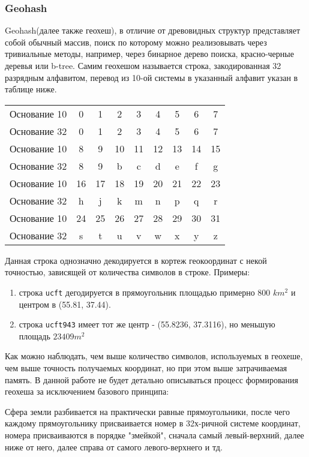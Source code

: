 \subsubsection{Geohash}
Geohash(далее также геохеш), в отличие от древовидных структур представляет собой обычный массив, поиск по которому можно реализовывать через тривиальные методы, например, через бинарное дерево поиска, красно-черные деревья или b-tree.
Самим геохешом называется строка, закодированная 32 разрядным алфавитом, перевод из 10-ой системы в указанный алфавит указан в таблице ниже.
\begin{center}
\begin{tabular}{ c|c c c c c c c c }
 Основание 10 & 0 & 1 & 2 & 3 & 4 & 5 & 6 & 7 \\
 Основание 32 & 0 & 1 & 2 & 3 & 4 & 5 & 6 & 7 \\
  \hline\hline
 Основание 10 & 8 & 9 & 10 & 11 & 12 & 13 & 14 & 15 \\
 Основание 32 & 8 & 9 & b & c & d & e & f & g \\
  \hline\hline
 Основание 10 & 16 & 17 & 18 & 19 & 20 & 21 & 22 & 23  \\
 Основание 32 & h & j & k & m & n & p & q & r \\
  \hline\hline
 Основание 10 & 24 & 25 & 26 & 27 & 28 & 29 & 30 & 31 \\
 Основание 32 & s & t & u & v & w & x & y & z \\
\end{tabular}
\end{center}
Данная строка однозначно декодируется в кортеж геокоординат с некой точностью, зависящей от количества символов в строке. Примеры:
\begin{enumerate}
    \item строка \texttt{ucft} дегодируется в прямоугольник площадью примерно 800 $ km^2 $ и центром в (55.81, 37.44).
    \item строка \texttt{ucft943} имеет тот же центр - (55.8236, 37.3116), но меньшую площадь $23409 m^2$
\end{enumerate}
Как можно наблюдать, чем выше количество символов, используемых в геохеше, чем выше точность получаемых координат, но при этом выше затрачиваемая память.
В данной работе не будет детально описываться процесс формирования геохеша за исключением базового принципа:

Сфера земли разбивается на практически равные прямоугольники, после чего каждому прямоугольнику присваивается номер в 32х-ричной системе координат, номера присваиваются в порядке "змейкой", сначала самый левый-верхний, далее ниже от него, далее справа от самого левого-верхнего и тд.

